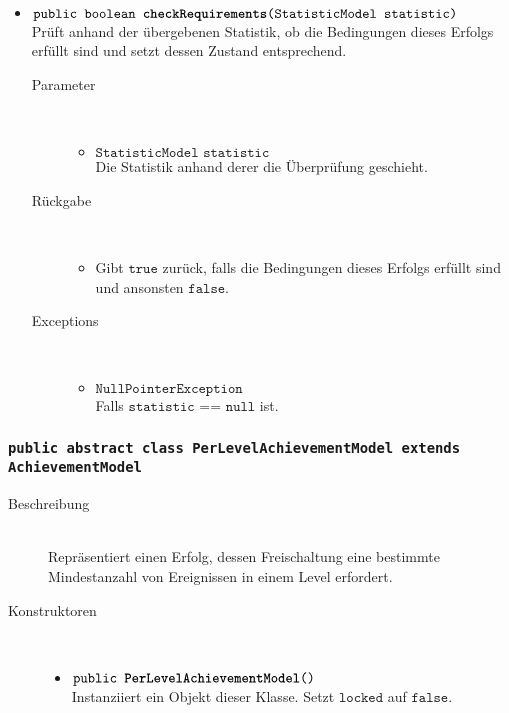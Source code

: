 \begin{description}
\begin{itemize}
		\item $\texttt{public boolean \textbf{checkRequirements}(StatisticModel statistic)}$ \\ Prüft anhand der übergebenen Statistik, ob die Bedingungen dieses Erfolgs erfüllt sind und setzt dessen Zustand entsprechend.
		\begin{description}
		\item[Parameter] \hfill \\
			\vspace{-.8cm}
			\begin{itemize}
				\item $\texttt{StatisticModel statistic}$ \\ Die Statistik anhand derer die Überprüfung geschieht. 
			\end{itemize}
			\item[Rückgabe] \hfill \\
			\vspace{-.8cm}
			\begin{itemize}
				\item Gibt $\texttt{true}$ zurück, falls die Bedingungen dieses Erfolgs erfüllt sind und ansonsten $\texttt{false}$.
			\end{itemize}
			\item[Exceptions] \hfill \\
			\vspace{-.8cm}
			\begin{itemize}
				\item $\texttt{NullPointerException}$ \\ Falls $\texttt{statistic == null}$ ist.
			\end{itemize}
		\end{description}
		
	\end{itemize}
\end{description}

\subsubsection{\normalfont \texttt{public abstract class \textbf{PerLevelAchievementModel} extends AchievementModel}}

\begin{description}
\item[Beschreibung] \hfill \\ Repräsentiert einen Erfolg, dessen Freischaltung eine bestimmte Mindestanzahl von Ereignissen in einem Level erfordert.

\item[Konstruktoren] \hfill \\
	\vspace{-.8cm}
	\begin{itemize}
		\item $\texttt{public \textbf{PerLevelAchievementModel}()}$ \\ Instanziiert ein Objekt dieser Klasse. Setzt $\texttt{locked}$ auf $\texttt{false}$.
	\end{itemize}

\end{description}



